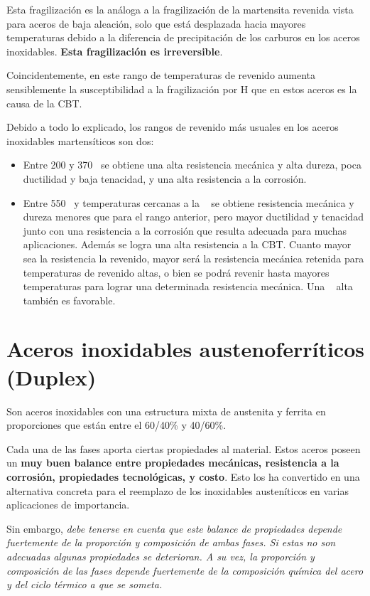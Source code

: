Esta fragilización es la análoga a la fragilización de la martensita revenida vista para aceros de baja aleación, solo que está desplazada hacia mayores temperaturas debido a la diferencia de precipitación de los carburos en los aceros inoxidables. \textbf{Esta fragilización es irreversible}. 

Coincidentemente, en este rango de temperaturas de revenido aumenta sensiblemente la susceptibilidad a la fragilización por H que en estos aceros es la causa de la CBT.

Debido a todo lo explicado, los rangos de revenido más usuales en los aceros inoxidables martensíticos son dos:
\begin{itemize}
	\item Entre 200 y 370\grad~ se obtiene una alta resistencia mecánica y alta	dureza, poca ductilidad y baja tenacidad, y una alta resistencia a la corrosión.
	\item Entre 550\grad~ y temperaturas cercanas a la \Aone~ se obtiene resistencia mecánica y dureza menores que para el rango anterior, pero mayor ductilidad y tenacidad junto con una resistencia a la corrosión que resulta adecuada para muchas aplicaciones. Además se logra una alta resistencia a la CBT. Cuanto mayor sea la resistencia la revenido, mayor será la resistencia mecánica retenida para temperaturas de revenido altas, o bien se podrá revenir hasta mayores temperaturas para lograr una determinada resistencia mecánica. Una \Aone~ alta también es favorable.
\end{itemize}



\section[Aceros Inoxidables Duplex]{Aceros inoxidables austenoferríticos (Duplex)}
Son aceros inoxidables con una estructura mixta de austenita y ferrita en proporciones que están entre el 60/40\% y 40/60\%.

Cada una de las fases aporta ciertas propiedades al material. Estos aceros poseen un \textbf{muy buen balance entre propiedades mecánicas, resistencia a la corrosión, propiedades tecnológicas, y costo}. Esto los ha convertido en una alternativa concreta para el reemplazo de los inoxidables austeníticos en varias aplicaciones de importancia.

Sin embargo, \emph{debe tenerse en cuenta que este balance de propiedades depende fuertemente de la proporción y composición de ambas fases. Si estas no son adecuadas algunas propiedades se deterioran. A su vez, la proporción y composición de las fases depende fuertemente de la composición química del acero y del ciclo térmico a que se someta.}

